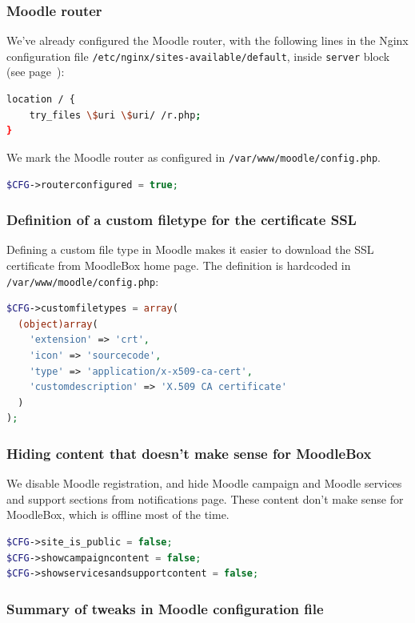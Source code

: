 \documentclass[12pt]{article}
\begin{document}
\subsubsection{Moodle router}

We've already configured the Moodle router, with the following lines in the Nginx configuration file \lstinline{/etc/nginx/sites-available/default}, inside \lstinline{server} block (see page~\pageref{ssec-nginx-php}):
\begin{lstlisting}[language=bash]
location / {
    try_files \$uri \$uri/ /r.php;
}
\end{lstlisting}
We mark the Moodle router as configured in \lstinline{/var/www/moodle/config.php}.
\begin{lstlisting}[language=php]
$CFG->routerconfigured = true;
\end{lstlisting}
\subsubsection{Definition of a custom filetype for the certificate SSL}

Defining a custom file type in Moodle makes it easier to download the SSL certificate from MoodleBox home page.
The definition is hardcoded in \lstinline{/var/www/moodle/config.php}:
\begin{lstlisting}[language=php]
$CFG->customfiletypes = array(
  (object)array(
    'extension' => 'crt',
    'icon' => 'sourcecode',
    'type' => 'application/x-x509-ca-cert',
    'customdescription' => 'X.509 CA certificate'
  )
);
\end{lstlisting}

\subsubsection{Hiding content that doesn't make sense for MoodleBox}

We disable Moodle registration, and hide Moodle campaign and Moodle services and support sections from notifications page.
These content don't make sense for MoodleBox, which is offline most of the time.
\begin{lstlisting}[language=php]
$CFG->site_is_public = false;
$CFG->showcampaigncontent = false;
$CFG->showservicesandsupportcontent = false;
\end{lstlisting}

\subsubsection{Summary of tweaks in Moodle configuration file}
\end{document}
